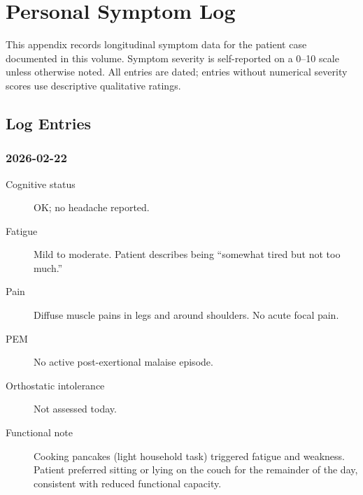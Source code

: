 
\section{Personal Symptom Log}
\label{sec:appendix-i-personal-symptoms}

This appendix records longitudinal symptom data for the patient case documented in this
volume. Symptom severity is self-reported on a 0--10 scale unless otherwise noted.
All entries are dated; entries without numerical severity scores use descriptive
qualitative ratings.

\subsection*{Log Entries}

\subsubsection*{2026-02-22}
\label{sym:2026-02-22}

\begin{description}
  \item[Cognitive status] OK; no headache reported.
  \item[Fatigue] Mild to moderate. Patient describes being ``somewhat tired but not too
    much.''
  \item[Pain] Diffuse muscle pains in legs and around shoulders. No acute focal pain.
  \item[PEM] No active post-exertional malaise episode.
  \item[Orthostatic intolerance] Not assessed today.
  \item[Functional note] Cooking pancakes (light household task) triggered fatigue and
    weakness. Patient preferred sitting or lying on the couch for the remainder of the
    day, consistent with reduced functional capacity.
\end{description}
